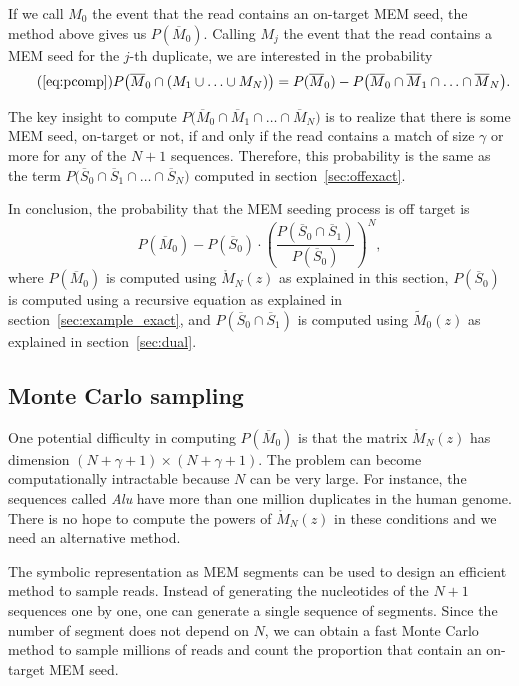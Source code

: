\documentclass{article}
\begin{document}
If we call $M_0$ the event that the read contains an on-target MEM seed,
the method above gives us $P(\overline{M}_0)$. Calling $M_j$ the event
that the read contains a MEM seed for the $j$-th duplicate, we are
interested in the probability
\begin{equation*}
\tag{\ref{eq:pcomp}}
P\big(\overline{M}_0 \cap (M_1 \cup \ldots \cup M_N)\big) =
P(\overline{M}_0) - P\big(\overline{M}_0 \cap \overline{M}_1 \cap \ldots
\cap \overline{M}_N\big).
\end{equation*}

The key insight to compute $P\big(\overline{M}_0 \cap \overline{M}_1 \cap
\ldots \cap \overline{M}_N\big)$ is to realize that there is some MEM
seed, on-target or not, if and only if the read contains a match of size
$\gamma$ or more for any of the $N+1$ sequences. Therefore, this
probability is the same as the term $P\big(\overline{S}_0 \cap
\overline{S}_1 \cap \ldots \cap \overline{S}_N\big)$ computed in
section~\ref{sec:offexact}.

In conclusion, the probability that the MEM seeding process is off target
is
\begin{equation}
\label{eq:PMEM}
P(\overline{M}_0) - P(\overline{S}_0) \cdot \left( \frac{P(\overline{S}_0
\cap \overline{S}_1)}{P(\overline{S}_0)} \right)^N,
\end{equation}
where $P(\overline{M}_0)$ is computed using $\mathring{M}_N(z)$ as
explained in this section, $P(\overline{S}_0)$ is computed using a
recursive equation as explained in section~\ref{sec:example_exact}, and
$P(\overline{S}_0\cap\overline{S}_1)$ is computed using $\tilde{M}_0(z)$
as explained in section~\ref{sec:dual}.

\subsection{Monte Carlo sampling}
\label{sec:montecarlo}

One potential difficulty in computing $P(\overline{M}_0)$ is that the
matrix $\mathring{M}_N(z)$ has dimension $(N+\gamma+1) \times
(N+\gamma+1)$. The problem can become computationally intractable because
$N$ can be very large. For instance, the sequences called \emph{Alu} have
more than one million duplicates in the human genome. There is no hope to
compute the powers of $\mathring{M}_N(z)$ in these conditions and we need
an alternative method.

The symbolic representation as MEM segments can be used to design an
efficient method to sample reads. Instead of generating the nucleotides of
the $N+1$ sequences one by one, one can generate a single sequence of
segments. Since the number of segment does not depend on $N$, we can
obtain a fast Monte Carlo method to sample millions of reads and count the
proportion that contain an on-target MEM seed.
\end{document}
